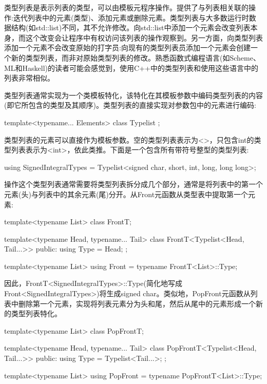 类型列表是表示列表的类型，可以由模板元程序操作。提供了与列表相关联的操作:迭代列表中的元素(类型)、添加元素或删除元素。类型列表与大多数运行时数据结构(如std::list)不同，其不允许修改。向std::list中添加一个元素会改变列表本身，而这个改变会让程序中有权访问该列表的操作观察到。另一方面，向类型列表添加一个元素不会改变原始的打字员:向现有的类型列表员添加一个元素会创建一个新的类型列表，而非对原始类型列表的修改。熟悉函数式编程语言(如Scheme、ML和Haskell)的读者可能会感觉到，使用C++中的类型列表和使用这些语言中的列表非常相似。

类型列表通常实现为一个类模板特化，该特化在其模板参数中编码类型列表的内容(即它所包含的类型及其顺序)。类型列表的直接实现对参数包中的元素进行编码:

\begin{cpp}
template<typename... Elements>
class Typelist
{
};
\end{cpp}

类型列表的元素可以直接作为模板参数。空的类型列表表示为<>，只包含int的类型列表表示为<int>，依此类推。下面是一个包含所有带符号整型的类型列表:

\begin{cpp}
using SignedIntegralTypes =
			Typelist<signed char, short, int, long, long long>;
\end{cpp}

操作这个类型列表通常需要将类型列表拆分成几个部分，通常是将列表中的第一个元素(头)与列表中的其余元素(尾)分开。从Front元函数从类型表中提取第一个元素:

\begin{cpp}
template<typename List>
class FrontT;

template<typename Head, typename... Tail>
class FrontT<Typelist<Head, Tail...>>
{
	public:
	using Type = Head;
};

template<typename List>
using Front = typename FrontT<List>::Type;
\end{cpp}

因此，FrontT<SignedIntegralTypes>::Type(简化地写成Front<SignedIntegralTypes>)将生成signed char。类似地，PopFront元函数从列表中删除第一个元素，实现将列表元素分为头和尾，然后从尾中的元素形成一个新的类型列表特化。

\begin{cpp}
template<typename List>
class PopFrontT;

template<typename Head, typename... Tail>
class PopFrontT<Typelist<Head, Tail...>> {
	public:
	using Type = Typelist<Tail...>;
};

template<typename List>
using PopFront = typename PopFrontT<List>::Type;
\end{cpp}

